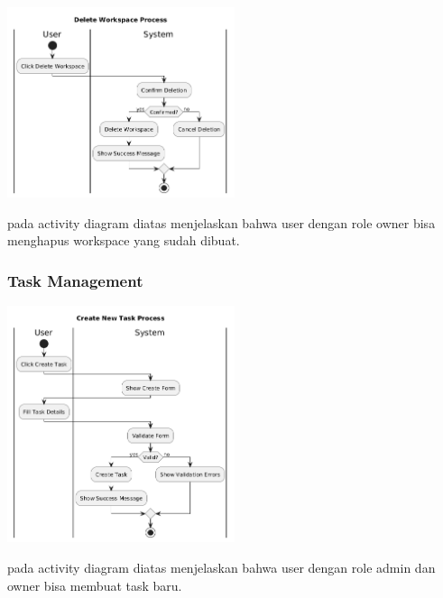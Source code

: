 \begin{center}
    \includegraphics[width=0.5\textwidth]{assets/activity_diagrams/workspace_delete.png}
\end{center}
pada activity diagram diatas menjelaskan bahwa user dengan role owner bisa menghapus workspace yang sudah dibuat.

\subsubsection*{Task Management}
\begin{center}
    \includegraphics[width=0.5\textwidth]{assets/activity_diagrams/task_create.png}
\end{center}
pada activity diagram diatas menjelaskan bahwa user dengan role admin dan owner bisa membuat task baru.

